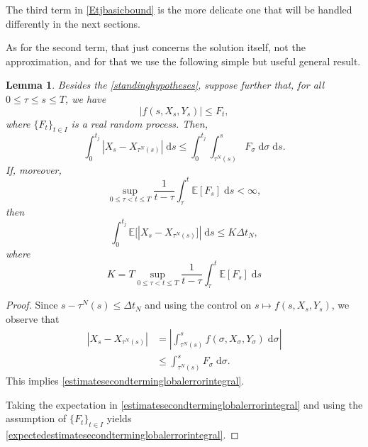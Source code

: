 \documentclass[reqno,12pt]{amsart}
\theoremstyle{plain}%
\newtheorem{lem}{Lemma}[section]
\theoremstyle{definition}
\begin{document}
The third term in \eqref{Etjbasicbound} is the more delicate one that will be handled differently in the next sections.

As for the second term, that just concerns the solution itself, not the approximation, and for that we use the following simple but useful general result.

\begin{lem}
    \label{estimatesecondterminglobalerror}
    Besides the \cref{standinghypotheses}, suppose further that, for all $0 \leq \tau \leq s \leq T$, we have
    \begin{equation}
        \label{Ftcondition}
      |f(s, X_s, Y_s)| \leq F_t,
    \end{equation}
    where $\{F_t\}_{t\in I}$ is a real random process. Then,
    \begin{equation}
        \label{estimatesecondterminglobalerrorintegral}
        \int_0^{t_j} |X_s - X_{\tau^N(s)}| \;\mathrm{d}s \leq \int_0^{t_j} \int_{\tau^N(s)}^s F_\sigma \;\mathrm{d}\sigma \;\mathrm{d}s.
    \end{equation}
    If, moreover,
    \begin{equation}
        \sup_{0 \leq \tau < t \leq T}\frac{1}{t - \tau}\int_\tau^t \mathbb{E}[F_s]\;\mathrm{d}s < \infty,
    \end{equation}
    then
    \begin{equation}
        \label{expectedestimatesecondterminglobalerrorintegral}
        \int_0^{t_j} \mathbb{E}[|X_s - X_{\tau^N(s)}]| \;\mathrm{d}s \leq K \Delta t_N,
    \end{equation}
    where
    \begin{equation}
      \label{Kconstantinestimatesecondterminglobalerror}
        K = T\sup_{0 \leq \tau < t \leq T}\frac{1}{t - \tau}\int_\tau^t \mathbb{E}[F_s]\;\mathrm{d}s
    \end{equation}
\end{lem}

\begin{proof}
    Since $s - \tau^N(s) \leq \Delta t_N$ and using the control on $s \mapsto f(s, X_s, Y_s)$, we observe that
    \begin{align*}
      \left|X_s - X_{\tau^N(s)}\right| & = \left|\int_{\tau^N(s)}^s f(\sigma, X_\sigma, Y_\sigma)\;\mathrm{d}\sigma\right| \\
      & \leq \int_{\tau^N(s)}^s F_\sigma \;\mathrm{d}\sigma.
    \end{align*}
    This implies \eqref{estimatesecondterminglobalerrorintegral}.

    Taking the expectation in \eqref{estimatesecondterminglobalerrorintegral} and using the assumption of $\{F_t\}_{t\in I}$ yields \eqref{expectedestimatesecondterminglobalerrorintegral}.
\end{proof}
\end{document}
